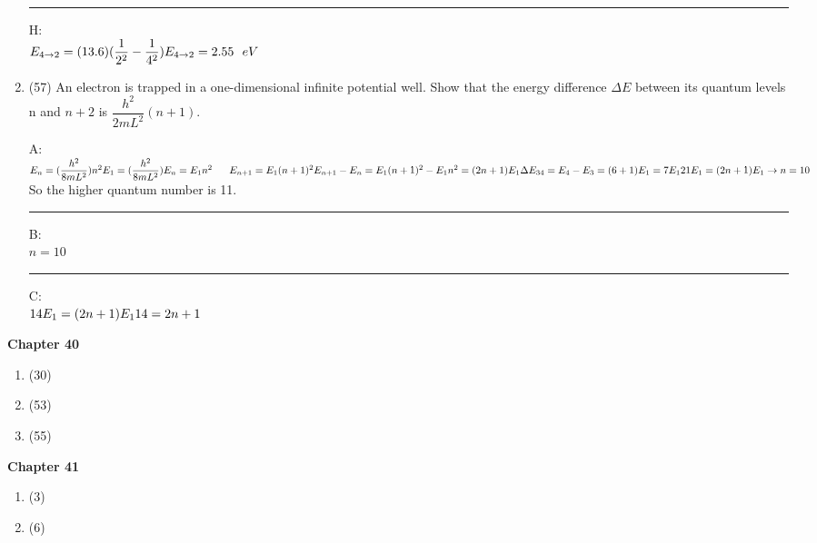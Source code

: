 \documentclass[fleqn]{article}
\begin{document}
\begin{enumerate}
    \textcolor{hwColor}{ 
      \rule{16cm}{0.6pt} 
    } 

    \textcolor{hwColor}{
      H: \\
      $
        E_{4 \rightarrow 2}=(13.6)(\dfrac{1}{2^2}-\dfrac{1}{4^2}) \\
        \\
        E_{4 \rightarrow 2}=2.55 ~~ eV
      $
    }
    
    
    \item (57) An electron is trapped in a one-dimensional infinite potential
    well. Show that the energy difference $\Delta E$ between its quantum levels n and $n+2$ is $\dfrac{h^2}{2mL^2}(n+1)$.

    \textcolor{hwColor}{
      A: \\
      $
        E_n=(\dfrac{h^2}{8mL^2})n^2 \\
        \\
        E_1=(\dfrac{h^2}{8mL^2}) \\
        \\
        E_n=E_1n^2 ~~~~~ E_{n+1}=E_1(n+1)^2 \\
        \\
        \\
        E_{n+1}-E_n=E_1(n+1)^2-E_1n^2=(2n+1)E_1 \\
        \\
        \Delta E_{34}=E_4-E_3=(6+1)E_1=7E_1 \\
        \\
        21E_1=(2n+1)E_1 \rightarrow n=10
      $ So the higher quantum number is 11.
    }

    \textcolor{hwColor}{ 
      \rule{16cm}{0.6pt} 
    } 

    \textcolor{hwColor}{
      B: \\
      $
        n=10
      $ 
    }

    \textcolor{hwColor}{ 
      \rule{16cm}{0.6pt} 
    } 

    \textcolor{hwColor}{
      C: \\
      $
        14E_1=(2n+1)E_1 \\
        \\
        14=2n+1
      $ 
    }


  \end{enumerate}

  \textbf{Chapter 40}
  \begin{enumerate}
    \item (30)


    \item (53)
    
    
    \item (55)
  \end{enumerate}

  \textbf{Chapter 41}
  \begin{enumerate}
    \item (3)


    \item (6)
    
    
  \end{enumerate}
\end{document}
